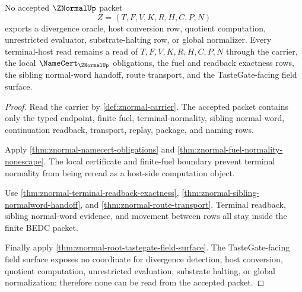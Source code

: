 \begin{theorem}
\label{thm:znormal-divergence-oracle-exclusion}
No accepted $\ZNormalUp$ packet
$$
Z=(T,F,V,K,R,H,C,P,N)
$$
exports a divergence oracle, host conversion row, quotient computation, unrestricted evaluator, substrate-halting row, or global normalizer. Every terminal-host read remains a read of $T,F,V,K,R,H,C,P,N$ through the carrier, the local $\NameCert_{\ZNormalUp}$ obligations, the fuel and readback exactness rows, the sibling normal-word handoff, route transport, and the TasteGate-facing field surface.
\end{theorem}
\begin{proof}
Read the carrier by \autoref{def:znormal-carrier}. The accepted packet contains only the typed endpoint, finite fuel, terminal-normality, sibling normal-word, continuation readback, transport, replay, package, and naming rows.

Apply \autoref{thm:znormal-namecert-obligations} and \autoref{thm:znormal-fuel-normality-nonescape}. The local certificate and finite-fuel boundary prevent terminal normality from being reread as a host-side computation object.

Use \autoref{thm:znormal-terminal-readback-exactness}, \autoref{thm:znormal-sibling-normalword-handoff}, and \autoref{thm:znormal-route-transport}. Terminal readback, sibling normal-word evidence, and movement between rows all stay inside the finite BEDC packet.

Finally apply \autoref{thm:znormal-root-tastegate-field-surface}. The TasteGate-facing field surface exposes no coordinate for divergence detection, host conversion, quotient computation, unrestricted evaluation, substrate halting, or global normalization; therefore none can be read from the accepted packet.
\end{proof}
